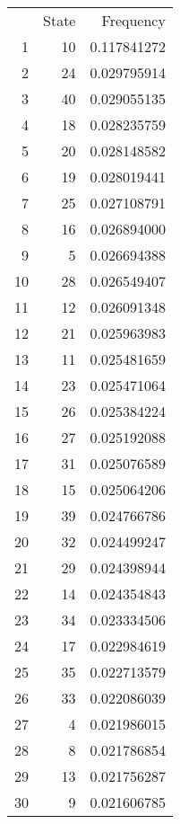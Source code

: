\documentclass[12pt]{article}
\begin{document}
\begin{table}
    \centering
    \begin{tabular}{rrr}
           & State      & Frequency   \\ 
        1  & 10         & 0.117841272 \\ 
        2  & 24         & 0.029795914 \\ 
        3  & 40         & 0.029055135 \\ 
        4  & 18         & 0.028235759 \\ 
        5  & 20         & 0.028148582 \\ 
        6  & 19         & 0.028019441 \\ 
        7  & 25         & 0.027108791 \\ 
        8  & 16         & 0.026894000 \\ 
        9  & 5          & 0.026694388 \\ 
        10 & 28         & 0.026549407 \\ 
        11 & 12         & 0.026091348 \\ 
        12 & 21         & 0.025963983 \\ 
        13 & 11         & 0.025481659 \\ 
        14 & 23         & 0.025471064 \\ 
        15 & 26         & 0.025384224 \\ 
        16 & 27         & 0.025192088 \\ 
        17 & 31         & 0.025076589 \\ 
        18 & 15         & 0.025064206 \\ 
        19 & 39         & 0.024766786 \\ 
        20 & 32         & 0.024499247 \\ 
        21 & 29         & 0.024398944 \\ 
        22 & 14         & 0.024354843 \\ 
        23 & 34         & 0.023334506 \\ 
        24 & 17         & 0.022984619 \\ 
        25 & 35         & 0.022713579 \\ 
        26 & 33         & 0.022086039 \\ 
        27 & 4          & 0.021986015 \\ 
        28 & 8          & 0.021786854 \\ 
        29 & 13         & 0.021756287 \\ 
        30 & 9          & 0.021606785 \\ 

\end{tabular}
\end{table}
\end{document}
